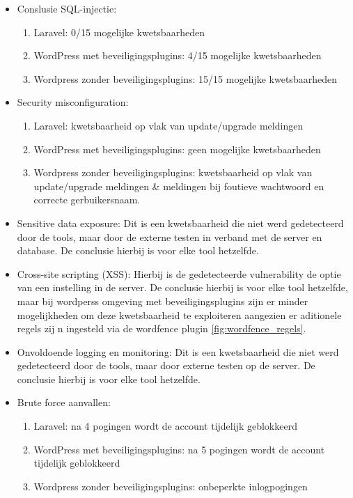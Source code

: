   \begin{itemize}
    \item Conslusie SQL-injectie:
    \begin{enumerate}
      \item Laravel: 0/15 mogelijke kwetsbaarheden
      \item WordPress met beveiligingsplugins: 4/15 mogelijke kwetsbaarheden
      \item Wordpress zonder beveiligingsplugins: 15/15 mogelijke kwetsbaarheden
    \end{enumerate}
    \item Security misconfiguration:
    \begin{enumerate}
      \item Laravel: kwetsbaarheid op vlak van update/upgrade meldingen
      \item WordPress met beveiligingsplugins: geen mogelijke kwetsbaarheden
      \item Wordpress zonder beveiligingsplugins: kwetsbaarheid op vlak van update/upgrade meldingen \& meldingen bij 
            foutieve wachtwoord en correcte gerbuikersnaam.
    \end{enumerate}
    \item Sensitive data exposure: Dit is een kwetsbaarheid die niet werd gedetecteerd door de tools, maar door de 
          externe testen in verband met de server en database. De conclusie hierbij is voor elke tool hetzelfde.
    \item Cross-site scripting (XSS): Hierbij is de gedetecteerde vulnerability de optie van een instelling in de 
          server. De conclusie hierbij is voor elke tool hetzelfde, maar bij wordperss omgeving met beveiligingsplugins 
          zijn er minder mogelijkheden om deze kwetsbaarheid te exploiteren aangezien er aditionele regels zij n ingesteld 
          via de wordfence plugin \ref{fig:wordfence_regels}.
    \item Onvoldoende logging en monitoring: Dit is een kwetsbaarheid die niet werd gedetecteerd door de tools, maar door 
          externe testen op de server. De conclusie hierbij is voor elke tool hetzelfde.
    \item Brute force aanvallen:
    \begin{enumerate}
      \item Laravel: na 4 pogingen wordt de account tijdelijk geblokkeerd
      \item WordPress met beveiligingsplugins: na 5 pogingen wordt de account tijdelijk geblokkeerd
      \item Wordpress zonder beveiligingsplugins: onbeperkte inlogpogingen
    \end{enumerate}
  \end{itemize}

